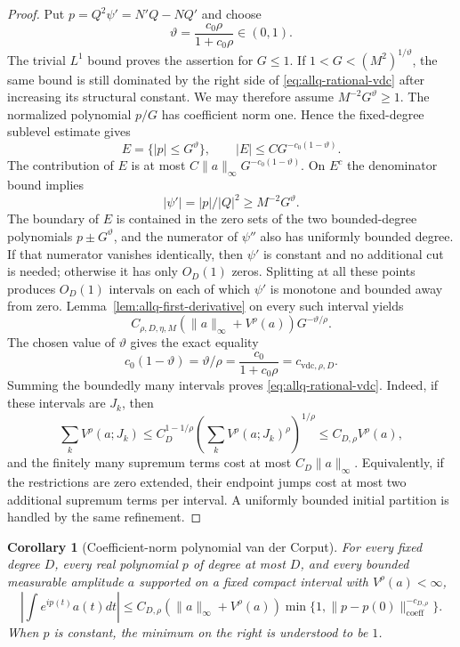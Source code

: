 \documentclass[11pt]{article}
\numberwithin{equation}{section}
\newtheorem{corollary}[theorem]{Corollary}
\theoremstyle{remark}
\theoremstyle{definition}
\begin{document}
\begin{proof}
Put $p=Q^2\psi'=N'Q-NQ'$ and choose
\[
 \vartheta=\frac{c_0\rho}{1+c_0\rho}\in(0,1).
\]
The trivial $L^1$ bound proves the assertion for $G\le1$.  If
$1<G<(M^2)^{1/\vartheta}$, the same bound is still dominated by the
right side of \eqref{eq:allq-rational-vdc} after increasing its structural
constant.  We may therefore assume $M^{-2}G^\vartheta\ge1$. The
normalized polynomial $p/G$ has coefficient norm one. Hence the
fixed-degree sublevel estimate gives
\[
 E=\{|p|\le G^\vartheta\},
 \qquad |E|\le C G^{-c_0(1-\vartheta)}.
\]
The contribution of $E$ is at most
$C\|a\|_\infty G^{-c_0(1-\vartheta)}$. On $E^c$ the denominator bound
implies
\[
 |\psi'|=|p|/|Q|^2\ge M^{-2}G^\vartheta.
\]
The boundary of $E$ is contained in the zero sets of the two
bounded-degree polynomials $p\pm G^\vartheta$, and the numerator of
$\psi''$ also has uniformly bounded degree.  If that numerator vanishes
identically, then $\psi'$ is constant and no additional cut is needed;
otherwise it has only $O_D(1)$ zeros. Splitting at all these points
produces $O_D(1)$ intervals on each of which $\psi'$ is monotone and
bounded away from zero. Lemma~\ref{lem:allq-first-derivative}
on every such interval yields
\[
 C_{\rho,D,\eta,M}
 (\|a\|_\infty+V^\rho(a))G^{-\vartheta/\rho}.
\]
The chosen value of $\vartheta$ gives the exact equality
\[
 c_0(1-\vartheta)=\vartheta/\rho
 =\frac{c_0}{1+c_0\rho}
 =c_{\mathrm{vdc},\rho,D}.
\]
Summing the boundedly many intervals proves
\eqref{eq:allq-rational-vdc}.  Indeed, if these intervals are $J_k$, then
\[
 \sum_k V^\rho(a;J_k)
 \le C_D^{1-1/\rho}
 \left(\sum_kV^\rho(a;J_k)^\rho\right)^{1/\rho}
 \le C_{D,\rho}V^\rho(a),
\]
and the finitely many supremum terms cost at most $C_D\|a\|_\infty$.
Equivalently, if the restrictions are zero extended, their endpoint jumps
cost at most two additional supremum terms per interval.  A uniformly
bounded initial partition is handled by the same refinement.
\end{proof}

\begin{corollary}[Coefficient-norm polynomial van der Corput]
\label{cor:allq-polynomial-vdc}
For every fixed degree $D$, every real polynomial $p$ of degree at most
$D$, and every bounded measurable amplitude $a$ supported on a fixed
compact interval with $V^\rho(a)<\infty$,
\begin{equation}\label{eq:allq-polynomial-vdc}
 \left|\int e^{ip(t)}a(t)dt\right|
 \le C_{D,\rho}(\|a\|_\infty+V^\rho(a))
 \min\{1,\|p-p(0)\|_{\mathrm{coeff}}^{-c_{D,\rho}}\}.
\end{equation}
When $p$ is constant, the minimum on the right is understood to be $1$.
\end{corollary}
\end{document}
